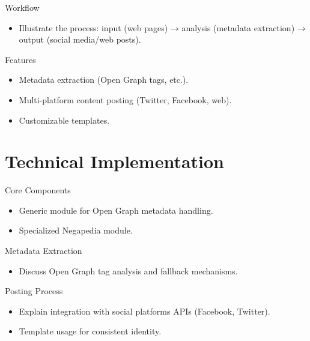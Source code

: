 \documentclass{beamer}
\begin{document}
    \begin{frame}{Workflow}
        \begin{itemize}
            \item Illustrate the process: input (web pages) → analysis (metadata extraction) → output (social media/web posts).
        \end{itemize}
    \end{frame}

    \begin{frame}{Features}
        \begin{itemize}
            \item Metadata extraction (Open Graph tags, etc.).
            \item Multi-platform content posting (Twitter, Facebook, web).
            \item Customizable templates.
        \end{itemize}
    \end{frame}


\section{Technical Implementation}
    \begin{frame}{Core Components}
        \begin{itemize}
            \item Generic module for Open Graph metadata handling.
            \item Specialized Negapedia module.
        \end{itemize}
    \end{frame}

    \begin{frame}{Metadata Extraction}
        \begin{itemize}
            \item Discuss Open Graph tag analysis and fallback mechanisms.
        \end{itemize}
    \end{frame}

    \begin{frame}{Posting Process}
        \begin{itemize}
            \item Explain integration with social platforms APIs (Facebook, Twitter).
            \item Template usage for consistent identity.
        \end{itemize}
    \end{frame}
\end{document}
